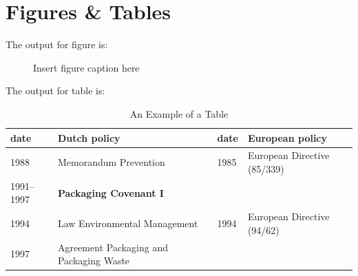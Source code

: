 \documentclass[openacc]{rsproca_new}%
\begin{document}
\section{Figures \& Tables}

The output for figure is:\vspace*{-7pt}

\begin{figure}[!h]
\caption{Insert figure caption here}
\label{fig_sim}
\end{figure}

\vspace*{-5pt}

\noindent The output for table is:\vspace*{-7pt}

\begin{table}[!h]
\caption{An Example of a Table}%
\label{table_example}
\begin{tabular}{llll}%
\hline
date &Dutch policy &date &European policy \\
\hline
1988 &Memorandum Prevention &1985 &European Directive (85/339) \\
1991--1997 &{\bf Packaging Covenant I} & & \\
1994 &Law Environmental Management &1994 &European Directive (94/62) \\
1997 &Agreement Packaging and Packaging Waste & & \\\hline
\end{tabular}
\vspace*{-4pt}
\end{table}%


\enlargethispage{20pt}








%




\end{document}
